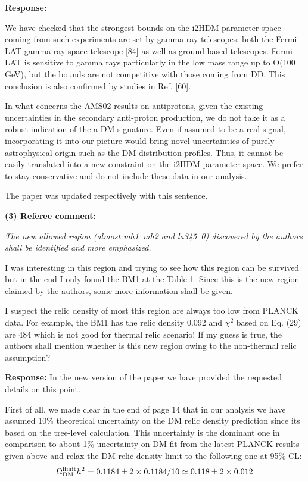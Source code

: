 \documentclass[11pt]{article}
\begin{document}
\bigskip

{\bf Response:}

We have checked that the strongest bounds on the i2HDM
parameter space coming from such experiments are set by gamma ray telescopes: both the Fermi-
LAT gamma-ray space telescope [84] as well as ground based telescopes. Fermi-LAT is sensitive
to gamma rays particularly in the low mass range up to O(100 GeV), but the bounds are not
competitive with those coming from DD. This conclusion is also confirmed by studies in Ref. [60].

In what concerns the AMS02 results on antiprotons, given the existing uncertainties
in the secondary anti-proton production, we do not take it as a robust indication of the a DM signature. 
Even if assumed to be a real signal, incorporating it into our picture would bring novel uncertainties 
of purely astrophysical origin such as the DM distribution profiles.  
Thus, it cannot be easily translated into a new constraint on the i2HDM parameter space.
We prefer to stay conservative and do not include these data in our analysis.

The paper was updated respectively with this sentence.

\bigskip
\noindent
{\bf (3) Referee comment:} {\it
The new allowed region (almost mh1~mh2 and la345~0) discovered by
the authors shall be identified and more emphasized.

I was interesting in this region and trying to see how this region can
be survived but in the end I only found the BM1 at the Table 1. Since
this is the new region claimed by the authors, some more information
shall be given.

I suspect the relic density of most this region are always too low
from PLANCK data. For example, the BM1 has the relic density 0.092 and
$\chi^2$ based on Eq. (29) are 484 which is not good for thermal relic
scenario! If my guess is true, the authors shall mention whether is
this new region owing to the non-thermal relic assumption?

}
\bigskip
{\bf Response:}
In the new version of the paper we have 
provided the requested details on this point.

First of all, we made clear in the end of page 14 that 
in our analysis we have assumed 10\% theoretical uncertainty  on the DM relic density prediction since its  based on the tree-level calculation. This uncertainty is the  dominant one in comparison to about 1\% uncertainty on DM fit from the latest PLANCK results given above and relax the DM relic density limit 
to the following one at 95\% CL:
\begin{equation}
\Omega_{\rm DM}^{\rm limit} h^2=0.1184\pm 2\times 0.1184/10
\simeq 0.118\pm 2\times 0.012
\label{eq:planck-limit-relaxed}
\end{equation}
\end{document}
